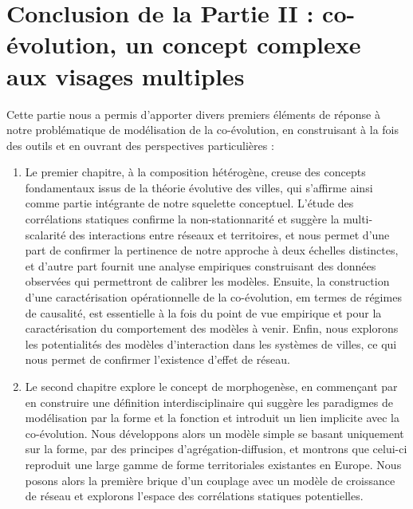 



\chapter*{Conclusion de la Partie II : co-évolution, un concept complexe aux visages multiples}








Cette partie nous a permis d'apporter divers premiers éléments de réponse à notre problématique de modélisation de la co-évolution, en construisant à la fois des outils et en ouvrant des perspectives particulières :
\begin{enumerate}
	\item Le premier chapitre, à la composition hétérogène, creuse des concepts fondamentaux issus de la théorie évolutive des villes, qui s'affirme ainsi comme partie intégrante de notre squelette conceptuel. L'étude des corrélations statiques confirme la non-stationnarité et suggère la multi-scalarité des interactions entre réseaux et territoires, et nous permet d'une part de confirmer la pertinence de notre approche à deux échelles distinctes, et d'autre part fournit une analyse empiriques construisant des données observées qui permettront de calibrer les modèles. Ensuite, la construction d'une caractérisation opérationnelle de la co-évolution, em termes de régimes de causalité, est essentielle à la fois du point de vue empirique et pour la caractérisation du comportement des modèles à venir. Enfin, nous explorons les potentialités des modèles d'interaction dans les systèmes de villes, ce qui nous permet de confirmer l'existence d'effet de réseau.
	\item Le second chapitre explore le concept de morphogenèse, en commençant par en construire une définition interdisciplinaire qui suggère les paradigmes de modélisation par la forme et la fonction et introduit un lien implicite avec la co-évolution. Nous développons alors un modèle simple se basant uniquement sur la forme, par des principes d'agrégation-diffusion, et montrons que celui-ci reproduit une large gamme de forme territoriales existantes en Europe. Nous posons alors la première brique d'un couplage avec un modèle de croissance de réseau et explorons l'espace des corrélations statiques potentielles.
\end{enumerate}


